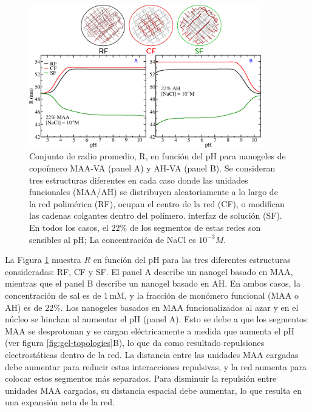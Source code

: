 \begin{figure}[!htb]
     \centering
     \includegraphics[width=0.9\textwidth]{Figures/graphs-gel2/rr.png}
     \caption{Conjunto de radio promedio, R, en funci\'on del pH para nanogeles de copo\'imero MAA-VA (panel A) y AH-VA (panel B).
     	Se consideran tres estructuras diferentes en cada caso donde las unidades funcionales (MAA/AH) se distribuyen aleatoriamente a lo largo de la red polim\'erica (RF), ocupan el centro de la red (CF), o modifican las cadenas colgantes dentro del pol\'imero. interfaz de soluci\'on (SF).
     	En todos los casos, el $22\%$ de los segmentos de estas redes son sensibles al pH; La concentraci\'on de NaCl es $10^{-3}M$.}
     \label{fig:gel-charge-MAA-AH}
\end{figure}

La Figura \ref{fig:gel-charge-MAA-AH} muestra $R$ en funci\'on del pH para las tres diferentes estructuras consideradas: RF, CF y SF.
El panel A describe un nanogel basado en MAA, mientras que el panel B describe un nanogel basado en AH.
En ambos casos, la concentraci\'on de sal es de 1\,mM, y la fracci\'on de mon\'omero funcional (MAA o AH) es de $22\%$.
Los nanogeles basados en MAA funcionalizados al azar y en el n\'ucleo se hinchan al aumentar el pH (panel A).
Esto se debe a que los segmentos MAA se desprotonan y se cargan el\'ectricamente a medida que aumenta el pH (ver figura \ref{fig:gel-topologies}B), lo que da como resultado repulsiones electrost\'aticas dentro de la red.
La distancia entre las unidades MAA cargadas debe aumentar para reducir estas interacciones repulsivas, y la red aumenta para colocar estos segmentos m\'as separados.
Para disminuir la repulsi\'on entre unidades MAA cargadas, su distancia espacial debe aumentar, lo que resulta en una expansión neta de la red.




